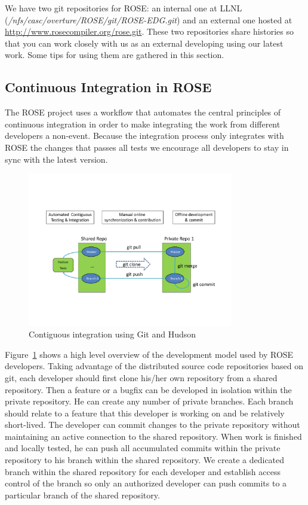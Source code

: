 We have two git repositories for ROSE: an internal one at LLNL (\textit{/nfs/casc/overture/ROSE/git/ROSE-EDG.git}) and an external
one hosted at \url{http://www.rosecompiler.org/rose.git}. These two repositories share histories so that
you can work closely with us as an external developing using our latest work. 
Some tips for using them are gathered in this section.


\subsection{Continuous Integration in ROSE}

The ROSE project uses a workflow that automates the central principles of
continuous integration in order to make integrating the work from different
developers a non-event. Because the integration process only integrates
with ROSE the changes that passes all tests we encourage all developers
to stay in sync with the latest version.

\begin{figure}[htbp]  
  \centering
    \includegraphics[width=0.8\textwidth]{rose-git-hudson.pdf}
  \caption{Contiguous integration using Git and Hudson}
  \label{fig:rose-git-hudson}
\end{figure}

Figure~\ref{fig:rose-git-hudson} shows a high level overview of the development model used by 
ROSE developers. Taking advantage of the distributed source code repositories based on git, 
each developer should first clone his/her own repository from a shared repository.
Then a feature or a bugfix can be developed in isolation within the private repository.
He can create any number of private branches. Each branch should relate to a
feature that this developer is working on and be relatively short-lived. 
The developer can commit changes to the private repository without
maintaining an active connection to 
the shared repository.  When work is finished and locally tested, he can push all accumulated commits within the private repository 
to his branch within the shared repository. 
We create a dedicated branch within the shared repository for each developer and establish access control of the
branch so only an authorized developer can push commits to a particular branch of the shared repository. 

